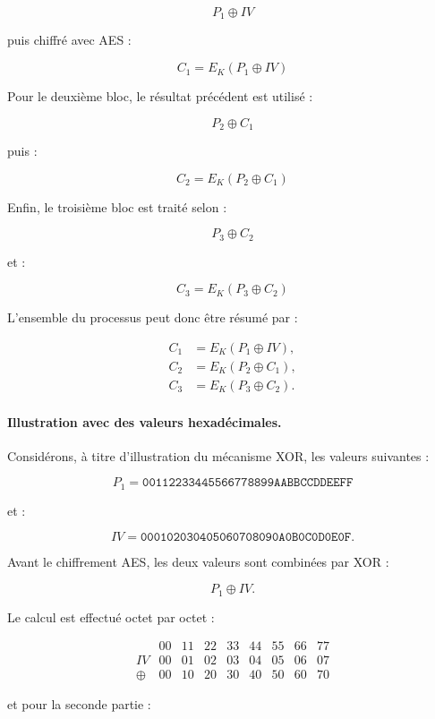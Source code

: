\documentclass[12pt,a4paper]{article}
\begin{document}
\[
P_1\oplus IV
\]

puis chiffré avec AES :

\[
\boxed{
C_1=E_K(P_1\oplus IV)
}
\]

Pour le deuxième bloc, le résultat précédent est utilisé :

\[
P_2\oplus C_1
\]

puis :

\[
\boxed{
C_2=E_K(P_2\oplus C_1)
}
\]

Enfin, le troisième bloc est traité selon :

\[
P_3\oplus C_2
\]

et :

\[
\boxed{
C_3=E_K(P_3\oplus C_2)
}
\]

L'ensemble du processus peut donc être résumé par :

\[
\boxed{
\begin{aligned}
C_1 &= E_K(P_1\oplus IV),\\
C_2 &= E_K(P_2\oplus C_1),\\
C_3 &= E_K(P_3\oplus C_2).
\end{aligned}
}
\]



\paragraph{Illustration avec des valeurs hexadécimales.}

Considérons, à titre d'illustration du mécanisme XOR, les valeurs
suivantes :

\[
P_1=\texttt{00112233445566778899AABBCCDDEEFF}
\]

et :

\[
IV=\texttt{000102030405060708090A0B0C0D0E0F}.
\]

Avant le chiffrement AES, les deux valeurs sont combinées par XOR :

\[
P_1\oplus IV.
\]

Le calcul est effectué octet par octet :

\[
\begin{array}{c|cccccccc}
 &00&11&22&33&44&55&66&77\\
IV&00&01&02&03&04&05&06&07\\
\hline
\oplus&00&10&20&30&40&50&60&70
\end{array}
\]

et pour la seconde partie :
\end{document}
